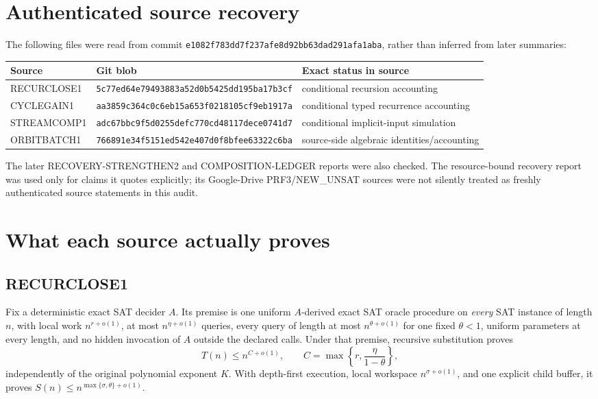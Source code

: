 \documentclass[11pt]{article}
\begin{document}
\section{Authenticated source recovery}
The following files were read from commit
\nolinkurl{e1082f783dd7f237afe8d92bb63dad291afa1aba}, rather than inferred
from later summaries:
\begin{center}\small
\begin{tabular}{lll}
\toprule
Source & Git blob & Exact status in source\\
\midrule
RECURCLOSE1 & \nolinkurl{5c77ed64e79493883a52d0b5425dd195ba17b3cf}
 & conditional recursion accounting\\
CYCLEGAIN1 & \nolinkurl{aa3859c364c0c6eb15a653f0218105cf9eb1917a}
 & conditional typed recurrence accounting\\
STREAMCOMP1 & \nolinkurl{adc67bbc9f5d0255defc770cd48117dece0741d7}
 & conditional implicit-input simulation\\
ORBITBATCH1 & \nolinkurl{766891e34f5151ed542e407d0f8bfee63322c6ba}
 & source-side algebraic identities/accounting\\
\bottomrule
\end{tabular}
\end{center}
The later RECOVERY-STRENGTHEN2 and COMPOSITION-LEDGER reports were also
checked.  The resource-bound recovery report was used only for claims it
quotes explicitly; its Google-Drive PRF3/NEW\_UNSAT sources were not silently
treated as freshly authenticated source statements in this audit.

\section{What each source actually proves}
\subsection*{RECURCLOSE1}
Fix a deterministic exact SAT decider $A$.  Its premise is one uniform
$A$-derived exact SAT oracle procedure on \emph{every} SAT instance of length
$n$, with local work $n^{r+o(1)}$, at most $n^{\eta+o(1)}$ queries, every
query of length at most $n^{\theta+o(1)}$ for one fixed $\theta<1$, uniform
parameters at every length, and no hidden invocation of $A$ outside the
declared calls.  Under that premise, recursive substitution proves
\[
 T(n)\le n^{C+o(1)},\qquad
 C=\max\left\{r,\frac{\eta}{1-\theta}\right\},
 \tag{3}
\]
independently of the original polynomial exponent $K$.  With depth-first
execution, local workspace $n^{\sigma+o(1)}$, and one explicit child buffer,
it proves $S(n)\le n^{\max\{\sigma,\theta\}+o(1)}$.
\end{document}
